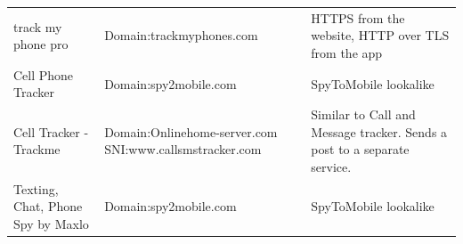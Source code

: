 \documentclass[acmtog]{acmart}
\begin{document}
\begin{table}
\begin{tabular}{p{5cm}p{5cm}p{5cm}}
	track my phone pro & Domain:trackmyphones.com & HTTPS from the website, HTTP over TLS from the app \\
	
	Cell Phone Tracker & Domain:spy2mobile.com & SpyToMobile lookalike \\
	
	Cell Tracker - Trackme & Domain:Onlinehome-server.com
	SNI:www.callsmstracker.com & Similar to Call and Message tracker. Sends a post to a separate service. \\
	
	Texting, Chat, Phone Spy by Maxlo & Domain:spy2mobile.com & SpyToMobile lookalike \\
\end{tabular}


\end{table}
\end{document}
